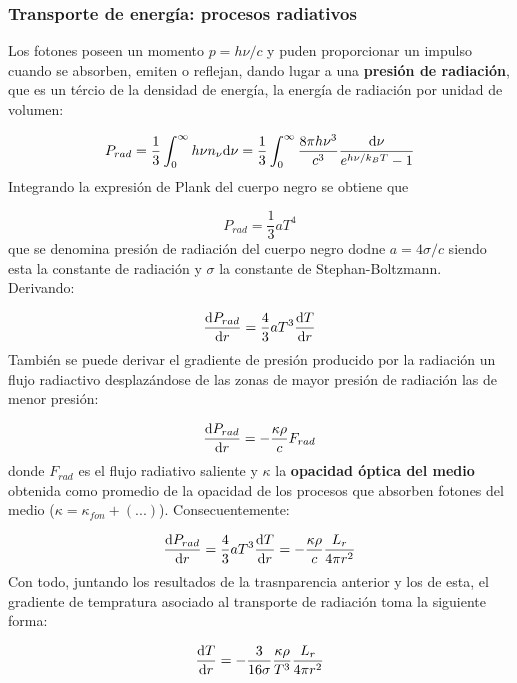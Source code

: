 \subsubsection{Transporte de energía: procesos radiativos}

Los fotones poseen un momento $p=h\nu/c$ y puden proporcionar un impulso cuando se absorben, emiten o reflejan, dando lugar a una \textbf{presión de radiación}, que es un tércio de la densidad de energía, la energía de radiación por unidad de volumen:

\begin{equation}
    P_{rad} = \frac{1}{3} \int_0^\infty h \nu n_\nu \mathrm{d} \nu = \frac{1}{3} \int_{0}^{\infty} \frac{8 \pi h \nu^3}{c^3} \frac{\mathrm{d} \nu}{e^{h\nu/k_BT}-1}
\end{equation}
Integrando la expresión de Plank del cuerpo negro se obtiene que 

\begin{equation}
    P_{rad} = \frac{1}{3} a T^4
\end{equation}
que se denomina presión de radiación del cuerpo negro dodne $a=4\sigma/c$ siendo esta la constante de radiación y $\sigma$ la constante de Stephan-Boltzmann. Derivando:

\begin{equation}
    \frac{\mathrm{d} P_{rad}}{\mathrm{d} r} = \frac{4}{3} a T^3 \frac{\mathrm{d} T}{\mathrm{d} r}
\end{equation}
También se puede derivar el gradiente de presión producido por la radiación un flujo radiactivo desplazándose de las zonas de mayor presión de radiación las de menor presión: 

\begin{equation}
    \frac{\mathrm{d} P_{rad}}{\mathrm{d} r} = - \frac{\kappa \rho}{c} F_{rad}
\end{equation}
donde $F_{rad}$ es el flujo radiativo saliente y $\kappa$ la \textbf{opacidad óptica del medio} obtenida como promedio de la opacidad de los procesos que absorben fotones del medio ($\kappa = \kappa_{fon} + (...)$). Consecuentemente: 

\begin{equation}
    \frac{\mathrm{d} P_{rad}}{\mathrm{d} r} = \frac{4}{3} a T^3 \frac{\mathrm{d} T}{\mathrm{d} r} = - \frac{\kappa \rho}{c} \frac{L_r}{4\pi r^2}
\end{equation}
Con todo, juntando los resultados de la trasnparencia anterior y los de esta, el gradiente de tempratura asociado al transporte de radiación toma la siguiente forma:

\begin{equation}
    \frac{\mathrm{d} T}{\mathrm{d} r} = - \frac{3}{16 \sigma} \frac{\kappa \rho}{T^3} \frac{L_r}{4\pi r^2}
\end{equation}

